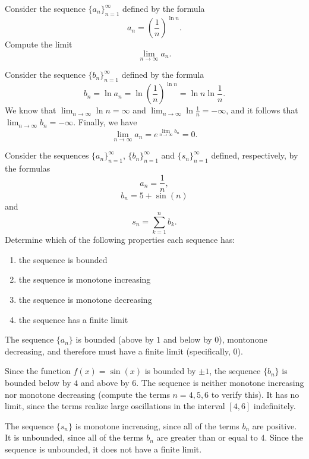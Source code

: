 \documentclass[]{ximera}
\begin{document}
\begin{problem}
Consider the sequence $\{a_n\}_{n=1}^\infty$ defined by the formula
$$
a_n = \left(\frac{1}{n}\right)^{\ln n}.
$$
Compute the limit
$$
\lim_{n \rightarrow \infty} a_n.
$$
\end{problem}

\begin{freeResponse}
Consider the sequence $\{b_n\}_{n=1}^\infty$ defined by the formula
$$
b_n = \ln a_n = \ln  \left(\frac{1}{n}\right)^{\ln n} = \ln n \ln \frac{1}{n}.
$$
We know that $\lim_{n\rightarrow \infty} \ln n = \infty$ and $\lim_{n\rightarrow \infty} \ln \frac{1}{n} = -\infty$, and it follows that $\lim_{n\rightarrow \infty} b_n = -\infty$.  Finally, we have
$$
\lim_{n\rightarrow \infty} a_n = e^{\lim_{n \rightarrow \infty} b_n} =0.
$$
\end{freeResponse}

\begin{problem}
Consider the sequences $\{a_n\}_{n=1}^\infty$, $\{b_n\}_{n=1}^\infty$ and $\{s_n\}_{n=1}^\infty$ defined, respectively, by the formulas
$$
a_n = \frac{1}{n},
$$
$$
b_n = 5 + \sin(n)
$$
and
$$
s_n = \sum_{k=1}^n b_k.
$$
Determine which of the following properties each sequence has:
\begin{enumerate}[label=(\alph*)]
\item the sequence is bounded
\item the sequence is monotone increasing
\item the sequence is monotone decreasing
\item the sequence has a finite limit
\end{enumerate}
\end{problem}

\begin{freeResponse}
The sequence $\{a_n\}$ is bounded (above by $1$ and below by $0$), montonone decreasing, and therefore must have a finite limit (specifically, $0$). 

Since the function $f(x)=\sin(x)$ is bounded by $\pm 1$, the sequence $\{b_n\}$ is bounded below by $4$ and above by $6$. The sequence is neither monotone increasing nor monotone decreasing (compute the terms $n=4,5,6$ to verify this). It has no limit, since the terms realize large oscillations in the interval $[4,6]$ indefinitely. 

The sequence $\{s_n\}$ is monotone increasing, since all of the terms $b_n$ are positive. It is unbounded, since all of the terms $b_n$ are greater than or equal to $4$. Since the sequence is unbounded, it does not have a finite limit. 
\end{freeResponse}
\end{document}
